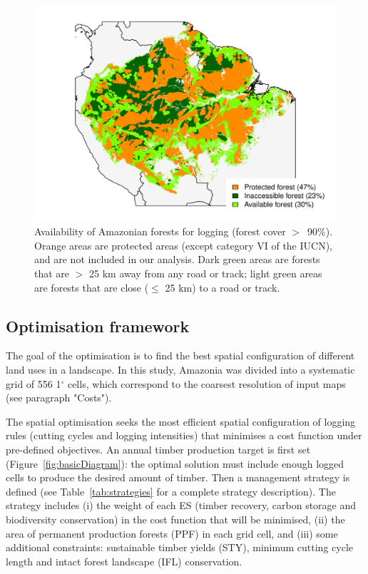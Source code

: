 \documentclass{article}
\begin{document}
\begin{figure}
    \centering
    \includegraphics[width=\linewidth]{graphs/harv_areas.pdf}
    \caption{Availability of Amazonian forests for logging (forest cover $>$~90\%). Orange areas are protected areas (except category VI of the IUCN), and are not included in our analysis. Dark green areas are forests that are $>$ 25 km away from any road or track; light green areas are forests that are close ($\leq$ 25 km) to a road or track.}
    \label{fig:pharv}
\end{figure}

\subsection{Optimisation framework}

The goal of the optimisation is to find the best spatial configuration of different land uses in a landscape. In this study, Amazonia was divided into a systematic grid of 556 1$^{\circ}$ cells, which correspond to the coarsest resolution of input maps (see paragraph "Costs"). 

The spatial optimisation seeks the most efficient spatial configuration of logging rules (cutting cycles and logging intensities) that minimises a cost function under pre-defined objectives. An annual timber production target is first set (Figure~\ref{fig:basicDiagram}): the optimal solution must include enough logged cells to produce the desired amount of timber. Then a management strategy is defined (see Table~\ref{tab:strategies} for a complete strategy description). The strategy includes (i) the weight of each ES (timber recovery, carbon storage and biodiversity conservation) in the cost function that will be minimised, (ii) the area of permanent production forests (PPF) in each grid cell, and (iii) some additional constraints: sustainable timber yields (STY), minimum cutting cycle length and intact forest landscape (IFL) conservation. 
\end{document}
